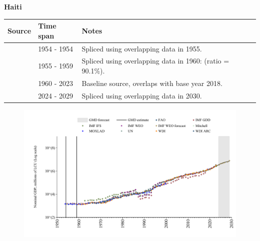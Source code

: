 \documentclass[12pt,a4paper,landscape]{article}
\begin{document}
\begin{adjustbox}{max totalsize={\paperwidth}{\paperheight},center}
\begin{minipage}[t][\textheight][t]{\textwidth}
\vspace*{0.5cm}
{}
\begin{center}
{\Large\bfseries Haiti}
\end{center}
\vspace{0.5cm}
\begin{table}[H]
\centering
\small
\begin{tabular}{|l|l|l|}
\hline
\textbf{Source} & \textbf{Time span} & \textbf{Notes} \\
\hline
\rowcolor{white}\cite{MOXLAD}& 1954 - 1954 &Spliced using overlapping data in 1955.\\
\rowcolor{lightgray}\cite{IMF_GDD}& 1955 - 1959 &Spliced using overlapping data in 1960: (ratio = 90.1\%).\\
\rowcolor{white}\cite{WDI}& 1960 - 2023 &Baseline source, overlaps with base year 2018.\\
\rowcolor{lightgray}\cite{IMF_WEO_forecast}& 2024 - 2029 &Spliced using overlapping data in 2030.\\
\hline
\end{tabular}
\end{table}
\begin{figure}[H]
\centering
\includegraphics[width=\textwidth,height=0.6\textheight,keepaspectratio]{graphs/HTI_nGDP.pdf}
\end{figure}
\end{minipage}
\end{adjustbox}
\end{document}
